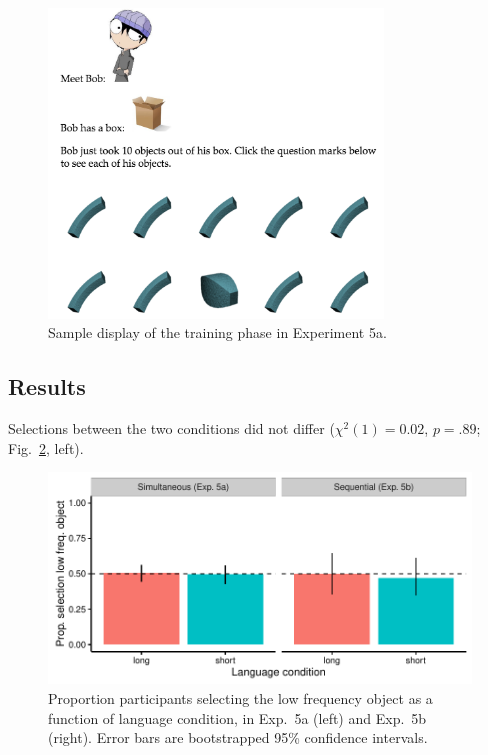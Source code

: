  \begin{figure}
 \begin{center}
  \includegraphics[width=3.5in]{figs/seqfreq_display.png}
  \caption{\label{fig:seqfreq_display} Sample display of the training phase in Experiment 5a.}
 \end{center}
\end{figure}


 \subsection{Results}
 Selections between the two conditions did not differ (${\chi}^2$$(1) = 0.02$, $p = .89$; Fig.\ \ref{fig:freq_plots}, left).
 
  \begin{figure}
 \begin{center}
  \includegraphics[width=6in]{figs/freq_plots.pdf}
  \caption{\label{fig:freq_plots} Proportion participants selecting the low frequency object as a function of language condition, in Exp.\ 5a (left) and Exp.\ 5b (right). Error bars are bootstrapped 95\% confidence intervals.}
 \end{center}
\end{figure}



